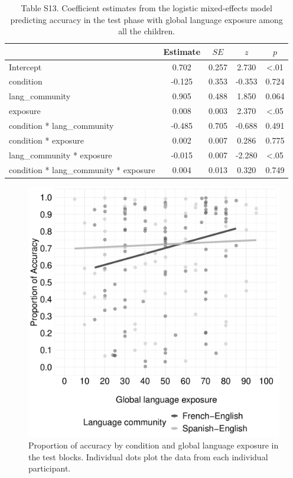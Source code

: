 \documentclass[
  man,floatsintext]{apa7}
\begin{document}
\begin{table}[H]

\begin{center}
\begin{threeparttable}

\caption{\label{tab:unnamed-chunk-39}Table S13. Coefficient estimates from the logistic mixed-effects model predicting accuracy in the test phase with global language exposure among all the children.}

\begin{tabular}{lcccc}
\toprule
 & Estimate & $SE$ & $z$ & $p$\\
\midrule
Intercept & 0.702 & 0.257 & 2.730 & <.01\\
condition & -0.125 & 0.353 & -0.353 & 0.724\\
lang\_community & 0.905 & 0.488 & 1.850 & 0.064\\
exposure & 0.008 & 0.003 & 2.370 & <.05\\
condition * lang\_community & -0.485 & 0.705 & -0.688 & 0.491\\
condition * exposure & 0.002 & 0.007 & 0.286 & 0.775\\
lang\_community * exposure & -0.015 & 0.007 & -2.280 & <.05\\
condition * lang\_community * exposure & 0.004 & 0.013 & 0.320 & 0.749\\
\bottomrule
\end{tabular}

\end{threeparttable}
\end{center}

\end{table}

\begin{figure}

{\centering \includegraphics[width=0.5\linewidth]{TabletSwitch_supplemental_files/figure-latex/FigureS9-1} 

}

\caption{Proportion of accuracy by condition and global language exposure in the test blocks. Individual dots plot the data from each individual participant.}\label{fig:FigureS9}
\end{figure}
\end{document}
